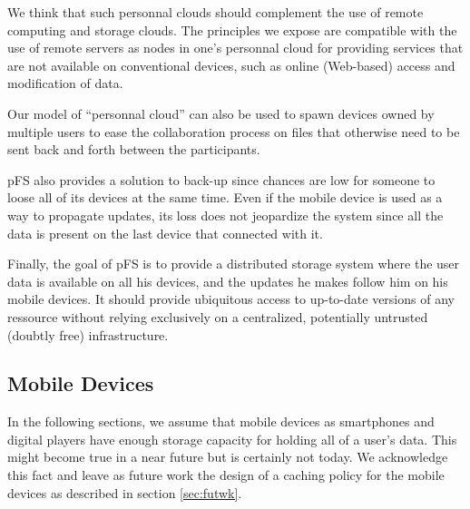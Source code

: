 We think that such personnal clouds should complement the use of
remote computing and storage clouds. The principles we expose are
compatible with the use of remote servers as nodes in one's personnal
cloud for providing services that are not available on conventional
devices, such as online (Web-based) access and modification of data.

Our model of ``personnal cloud'' can also be used to spawn devices
owned by multiple users to ease the collaboration process on files that
otherwise need to be sent back and forth between the participants.

pFS also provides a solution to back-up since chances are low
for someone to loose all of its devices at the same time. Even if the
mobile device is used as a way to propagate updates, its loss does not
jeopardize the system since all the data is present on the last device
that connected with it. 

Finally, the goal of pFS is to provide a distributed storage system
where the user data is available on all his devices, and the updates
he makes follow him on his mobile devices. It should provide
ubiquitous access to up-to-date versions of any ressource without
relying exclusively on a centralized, potentially untrusted (doubtly
free) infrastructure.


\subsection {Mobile Devices}

In the following sections, we assume that mobile devices as smartphones and
digital players have enough storage capacity for holding all of a
user's data. This might become true in a near future but is certainly
not today. We acknowledge this fact and leave as future work the
design of a caching policy for the mobile devices as described in section 
\ref{sec:futwk}.



